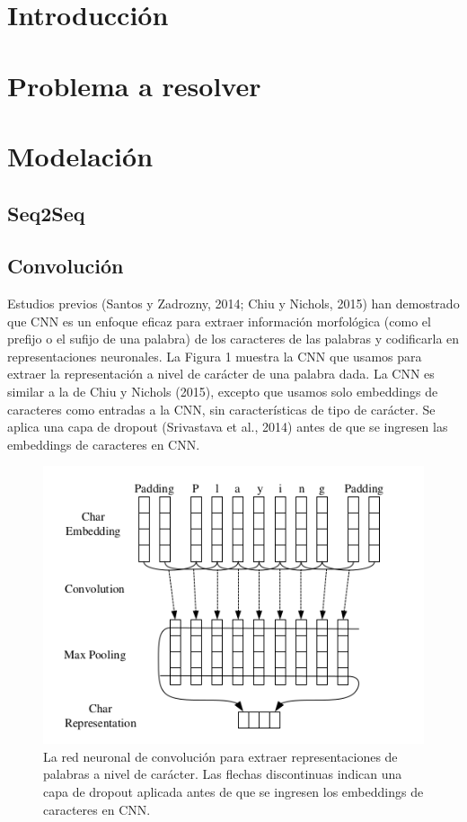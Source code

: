 \documentclass[runningheads]{llncs}
\begin{document}
\section{Introducción}

\section{Problema a resolver}

\section{Modelación}

\subsection{Seq2Seq}

\subsection{Convolución}
Estudios previos (Santos y Zadrozny, 2014; Chiu y Nichols, 2015) han demostrado que CNN es un enfoque eficaz para extraer información morfológica (como el prefijo o el sufijo de una palabra) de los caracteres de las palabras y codificarla en representaciones neuronales. La Figura 1 muestra la CNN que usamos para extraer la representación a nivel de carácter de una palabra dada. La CNN es similar a la de Chiu y Nichols (2015), excepto que usamos solo embeddings de caracteres como entradas a la CNN, sin características de tipo de carácter. Se aplica una capa de dropout (Srivastava et al., 2014) antes de que se ingresen las embeddings de caracteres en CNN.


\begin{figure}
	\centering
	\includegraphics[width=12cm]{Fig_1.png}
	\caption{ La red neuronal de convolución para extraer representaciones de palabras a nivel de carácter. Las flechas discontinuas indican una capa de dropout aplicada antes de que se ingresen los embeddings de caracteres en CNN.}
	\label{F1}
\end{figure}
\end{document}
